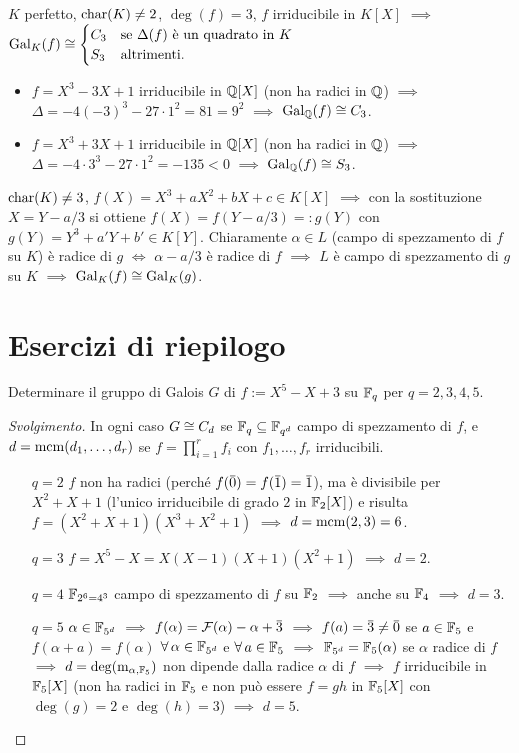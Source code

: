 $K$ perfetto, $\car(K)\ne2$, $\deg(f)=3$, $f$ irriducibile in $K[X]$ $\implies$
$\Gal[K]{f}\iso
\begin{cases}
C_3 & \text{se $\Delta(f)$ è un quadrato in $K$}\\
S_3 & \text{altrimenti.}
\end{cases}
$
\begin{esem}
\begin{itemize}
\item $f=X^3-3X+1$ irriducibile in $\Q[X]$ (non ha radici in $\Q$) $\implies$ $\Delta=-4(-3)^3-27\cdot1^2=81=9^2$ $\implies$ $\Gal[\Q]{f}\iso C_3$.
\item $f=X^3+3X+1$ irriducibile in $\Q[X]$ (non ha radici in $\Q$) $\implies$ $\Delta=-4\cdot3^3-27\cdot1^2=-135<0$ $\implies$ $\Gal[\Q]{f}\iso S_3$.
\end{itemize}
\end{esem}
\begin{osse}
$\car(K)\ne3$, $f(X)=X^3+aX^2+bX+c\in K[X]$ $\implies$ con la sostituzione $X=Y-a/3$ si ottiene $f(X)=f(Y-a/3)=:g(Y)$ con $g(Y)=Y^3+a'Y+b'\in K[Y]$. Chiaramente $\alpha\in L$ (campo di spezzamento di $f$ su $K$) è radice di $g$ $\iff$ $\alpha-a/3$ è radice di $f$ $\implies$ $L$ è campo di spezzamento di $g$ su $K$ $\implies$ $\Gal[K]{f}\iso\Gal[K]{g}$.
\end{osse}



\section{Esercizi di riepilogo}

\begin{eser}
Determinare il gruppo di Galois $G$ di $f:=X^5-X+3$ su $\F_q$ per $q=2,3,4,5$.
\end{eser}

\begin{proof}[Svolgimento]
In ogni caso $G\iso C_d$ se $\F_q\subseteq\F_{q^d}$ campo di spezzamento di $f$, e $d=\mcm(d_1,\dots,d_r)$ se $f=\prod_{i=1}^rf_i$ con $f_1,\dots,f_r$ irriducibili.
\begin{itemize}
\item[$q=2$] $f$ non ha radici (perché $f(\cl{0})=f(\cl{1})=\cl{1}$), ma è divisibile per $X^2+X+1$ (l'unico irriducibile di grado $2$ in $\F_2[X]$) e risulta $f=(X^2+X+1)(X^3+X^2+1)$ $\implies$ $d=\mcm(2,3)=6$.
\item[$q=3$] $f=X^5-X=X(X-1)(X+1)(X^2+1)$ $\implies$ $d=2$.
\item[$q=4$] $\F_{2^6=4^3}$ campo di spezzamento di $f$ su $\F_2$ $\implies$ anche su $\F_4$ $\implies$ $d=3$.
\item[$q=5$] $\alpha\in\F_{5^d}$ $\implies$ $f(\alpha)=\Fro(\alpha)-\alpha+\cl{3}$ $\implies$ $f(a)=\cl{3}\ne\cl{0}$ se $a\in\F_5$ e $f(\alpha+a)=f(\alpha)$ $\all\alpha\in\F_{5^d}$ e $\all a\in\F_5$ $\implies$ $\F_{5^d}=\F_5(\alpha)$ se $\alpha$ radice di $f$ $\implies$ $d=\deg(\polmin_{\alpha,\F_5})$ non dipende dalla radice $\alpha$ di $f$ $\implies$ $f$ irriducibile in $\F_5[X]$ (non ha radici in $\F_5$ e non pu\`o essere $f=gh$ in $\F_5[X]$ con $\deg(g)=2$ e $\deg(h)=3$) $\implies$ $d=5$.\qedhere
\end{itemize}
\end{proof}


